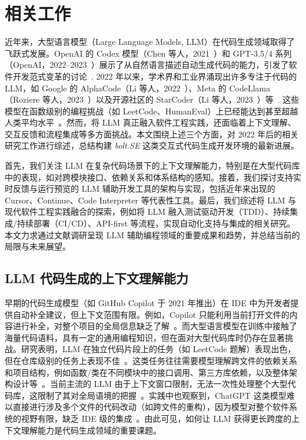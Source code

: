 


\chapter{相关工作}

近年来，大型语言模型（Large Language Models, LLM）在代码生成领域取得了飞跃式发展。OpenAI 的 Codex 模型（Chen 等人，2021~\cite{Chen2021}）和 GPT-3.5/4 系列（OpenAI，2022--2023~\cite{OpenAI2022}）展示了从自然语言描述自动生成代码的能力，引发了软件开发范式变革的讨论~\cite{arxiv2401}. 2022 年以来，学术界和工业界涌现出许多专注于代码的 LLM，如 Google 的 AlphaCode（Li 等人，2022~\cite{Li2022AlphaCode}）、Meta 的 CodeLlama（Roziere 等人，2023~\cite{Roziere2023}）以及开源社区的 StarCoder（Li 等人，2023~\cite{Li2023StarCoder}）等~\cite{arxiv2401}. 这些模型在函数级别的编程挑战（如 LeetCode、HumanEval）上已经能达到甚至超越人类平均水平~\cite{LLMCodeGraph2024}。然而，将 LLM 真正融入软件工程实践，还面临着上下文理解、交互反馈和流程集成等多方面挑战。本文围绕上述三个方面，对 2022 年后的相关研究工作进行综述，总结构建 \emph{bolt.SE} 这类交互式代码生成开发环境的最新进展。

首先，我们关注 LLM 在复杂代码场景下的上下文理解能力，特别是在大型代码库中的表现，如对跨模块接口、依赖关系和体系结构的感知。接着，我们探讨支持实时反馈与运行预览的 LLM 辅助开发工具的架构与实现，包括近年来出现的 Cursor、Continue、Code Interpreter 等代表性工具。最后，我们综述将 LLM 与现代软件工程实践融合的探索，例如将 LLM 融入测试驱动开发（TDD）、持续集成/持续部署（CI/CD）、API-first 等流程，实现自动化支持与集成的相关研究。本文力求通过文献调研呈现 LLM 辅助编程领域的重要成果和趋势，并总结当前的局限与未来展望。

\section{LLM 代码生成的上下文理解能力}

早期的代码生成模型（如 GitHub Copilot 于 2021 年推出）在 IDE 中为开发者提供自动补全建议，但上下文范围有限。例如，Copilot 只能利用当前打开文件的内容进行补全，对整个项目的全局信息缺乏了解~\cite{DivaCopilot}。而大型语言模型在训练中接触了海量代码语料，具有一定的通用编程知识，但在面对大型代码库时仍存在显著挑战。研究表明，LLM 在独立代码片段上的任务（如 LeetCode 题解）表现出色，但在仓库级别的任务上表现不佳~\cite{LLMCodeGraph2024}。这类任务往往需要模型理解跨文件的依赖关系和项目结构，例如函数/类在不同模块中的接口调用、第三方库依赖，以及整体架构设计等~\cite{LLMCodeGraph2024}。当前主流的 LLM 由于上下文窗口限制，无法一次性处理整个大型代码库，这限制了其对全局语境的把握~\cite{LLMCodeGraph2024}。实践中也观察到，ChatGPT 这类模型难以直接进行涉及多个文件的代码改动（如跨文件的重构），因为模型对整个软件系统的视野有限，缺乏 IDE 级的集成~\cite{ChatGPTUsage2023}。由此可见，如何让 LLM 获得更长跨度的上下文理解能力是代码生成领域的重要课题。

